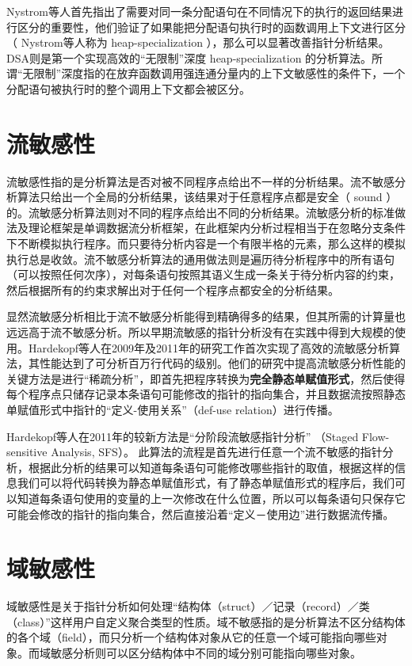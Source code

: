 Nystrom等人\supercite{nystrom2004importance}首先指出了需要对同一条分配语句在不同情况下的执行的返回结果进行区分的重要性，他们验证了如果能把分配语句执行时的函数调用上下文进行区分 （ Nystrom等人称为 heap-specialization ），那么可以显著改善指针分析结果。DSA则是第一个实现高效的“无限制”深度 heap-specialization 的分析算法。所谓“无限制”深度指的在放弃函数调用强连通分量内的上下文敏感性的条件下，一个分配语句被执行时的整个调用上下文都会被区分。

\section{流敏感性}
流敏感性指的是分析算法是否对被不同程序点给出不一样的分析结果。流不敏感分析算法只给出一个全局的分析结果，该结果对于任意程序点都是安全（ sound ）的。流敏感分析算法则对不同的程序点给出不同的分析结果。流敏感分析的标准做法及理论框架是单调数据流分析框架，在此框架内分析过程相当于在忽略分支条件下不断模拟执行程序。而只要待分析内容是一个有限半格的元素，那么这样的模拟执行总是收敛。流不敏感分析算法的通用做法则是遍历待分析程序中的所有语句（可以按照任何次序），对每条语句按照其语义生成一条关于待分析内容的约束，然后根据所有的约束求解出对于任何一个程序点都安全的分析结果。

显然流敏感分析相比于流不敏感分析能得到精确得多的结果，但其所需的计算量也远远高于流不敏感分析。所以早期流敏感的指针分析\supercite{earlyFS...}没有在实践中得到大规模的使用。Hardekopf等人在2009年\supercite{Hardekopf2009}及2011年\supercite{hardekopf2011flow}的研究工作首次实现了高效的流敏感分析算法，其性能达到了可分析百万行代码的级别。他们的研究中提高流敏感分析性能的关键方法是进行“稀疏分析”\supercite{choi1991automatic}，即首先把程序转换为\textbf{完全静态单赋值形式}，然后使得每个程序点只储存记录本条语句可能修改的指针的指向集合，并且数据流按照静态单赋值形式中指针的“定义-使用关系”（def-use relation）进行传播。

Hardekopf等人在2011年\supercite{hardekopf2011flow}的较新方法是“分阶段流敏感指针分析” （Staged Flow-sensitive Analysis, SFS）。 此算法的流程是首先进行任意一个流不敏感的指针分析，根据此分析的结果可以知道每条语句可能修改哪些指针的取值，根据这样的信息我们可以将代码转换为静态单赋值形式\supercite{Cytron:1991}，有了静态单赋值形式的程序后，我们可以知道每条语句使用的变量的上一次修改在什么位置，所以可以每条语句只保存它可能会修改的指针的指向集合，然后直接沿着“定义－使用边”进行数据流传播。

\section{域敏感性}
域敏感性是关于指针分析如何处理“结构体（struct）／记录（record）／类（class）”这样用户自定义聚合类型的性质。域不敏感指的是分析算法不区分结构体的各个域（field），而只分析一个结构体对象从它的任意一个域可能指向哪些对象。而域敏感分析则可以区分结构体中不同的域分别可能指向哪些对象。

